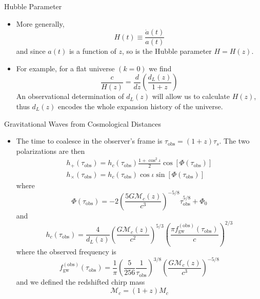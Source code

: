 \documentclass[size=11pt,style=paintings]{powerdot}
\begin{document}
  
  \begin{slide}{Hubble Parameter}
 \begin{itemize}
 \item More generally, 
 $$
H(t) \equiv \frac{\dot{a}\left(t\right)}{a\left(t\right)}
$$
and since $a(t)$ is a function of $z$, so is the Hubble parameter $H=H(z)$.

\item For example, for a flat universe $(k=0)$ we find
$$
\boxed{\frac{c}{H(z)}=\frac{d}{d z}\left(\frac{d_{L}(z)}{1+z}\right)}
$$
An observational determination of $d_L(z)$ will allow us to calculate $H(z)$, thus $d_L(z)$ encodes the whole expansion history of the universe.
 \end{itemize}
 \end{slide}
 
  
  \begin{slide}{Gravitational Waves from Cosmological Distances}
 \begin{itemize}
 \item The time to coalesce in the observer's frame is $
\tau_{\mathrm{obs}}=(1+z) \tau_{s}$. The two polarizations are then
\vskip -0.2cm
 $$
\begin{array}{l}{h_{+}\left(\tau_{\mathrm{obs}}\right)=h_{c}\left(\tau_{\mathrm{obs}}\right) \frac{1+\cos ^{2} \iota}{2} \cos \left[\Phi\left(\tau_{\mathrm{obs}}\right)\right]} \\ {h_{\times}\left(\tau_{\mathrm{obs}}\right)=h_{c}\left(\tau_{\mathrm{obs}}\right) \cos \iota \sin \left[\Phi\left(\tau_{\mathrm{obs}}\right)\right]}\end{array}
$$
\vskip -0.2cm
where
$$
\Phi\left(\tau_{\mathrm{obs}}\right)=-2\left(\frac{5 G \mathcal{M}_{c}(z)}{c^{3}}\right)^{-5 / 8} \tau_{\mathrm{obs}}^{5 / 8}+\Phi_{0}
$$
\vskip -0.2cm
and $$
h_{c}\left(\tau_{\mathrm{obs}}\right)=\frac{4}{d_{L}(z)}\left(\frac{G \mathcal{M}_{c}(z)}{c^{2}}\right)^{5 / 3}\left(\frac{\pi f_{\mathrm{gw}}^{(\mathrm{obs})}\left(\tau_{\mathrm{obs}}\right)}{c}\right)^{2 / 3}
$$
\vskip -0.2cm
where the observed frequency is
\vskip -0.2cm
$$
f_{\mathrm{gw}}^{(\mathrm{obs})}\left(\tau_{\mathrm{obs}}\right)=\frac{1}{\pi}\left(\frac{5}{256} \frac{1}{\tau_{\mathrm{obs}}}\right)^{3 / 8}\left(\frac{G \mathcal{M}_{c}(z)}{c^{3}}\right)^{-5 / 8}
$$
and we defined the redshifted chirp mass
$$
\mathcal{M}_{c}=(1+z) M_{c}
$$
 \end{itemize}
 \end{slide}
 
\end{document}
